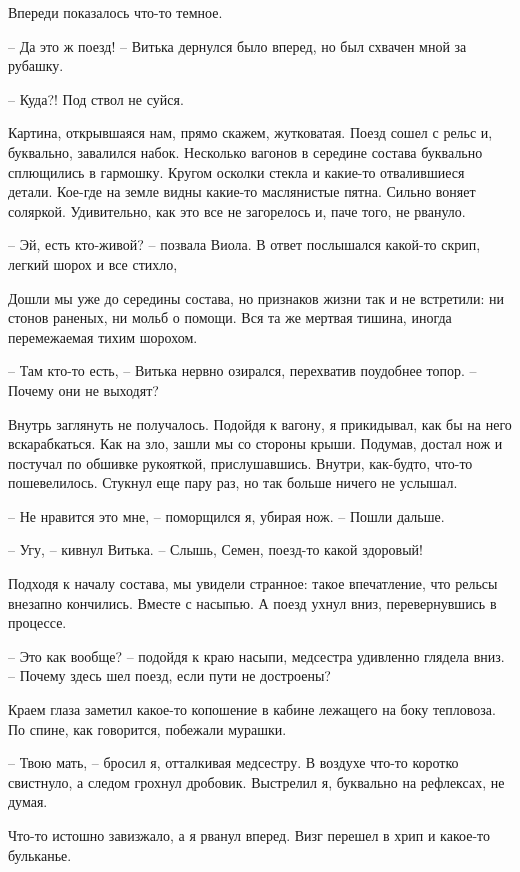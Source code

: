 \documentclass[a4paper]{book}
\begin{document}
Впереди показалось что-то темное.  

-- Да это ж поезд! -- Витька дернулся было вперед, но был схвачен мной за рубашку. 

-- Куда?! Под ствол не суйся.


Картина, открывшаяся нам, прямо скажем, жутковатая. Поезд сошел с рельс и, буквально, завалился набок. Несколько вагонов в середине состава буквально сплющились в гармошку. Кругом осколки стекла и какие-то отвалившиеся детали. Кое-где на земле видны какие-то маслянистые пятна. Сильно воняет соляркой. Удивительно, как это все не загорелось и, паче того, не рвануло.

-- Эй, есть кто-живой? -- позвала Виола. В ответ послышался какой-то скрип, легкий шорох и все стихло,

Дошли мы уже до середины состава, но признаков жизни так и не встретили: ни стонов раненых, ни мольб о помощи. Вся та же мертвая тишина, иногда перемежаемая тихим шорохом.

-- Там кто-то есть, -- Витька нервно озирался, перехватив поудобнее топор. -- Почему они не выходят?

Внутрь заглянуть не получалось. Подойдя к вагону, я прикидывал, как бы на него вскарабкаться. Как на зло, зашли мы со стороны крыши. Подумав, достал нож и постучал по обшивке рукояткой, прислушавшись. Внутри, как-будто, что-то пошевелилось. Стукнул еще пару раз, но так больше ничего не услышал.

-- Не нравится это мне, -- поморщился я, убирая нож. -- Пошли дальше.

-- Угу, -- кивнул Витька. -- Слышь, Семен, поезд-то какой здоровый!

Подходя к началу состава, мы увидели странное: такое впечатление, что рельсы внезапно кончились. Вместе с насыпью. А поезд ухнул вниз, перевернувшись в процессе. 

-- Это как вообще? -- подойдя к краю насыпи, медсестра удивленно глядела вниз. -- Почему здесь шел поезд, если пути не достроены? 

Краем глаза заметил какое-то копошение в кабине лежащего на боку тепловоза. По спине, как говорится, побежали мурашки. 

-- Твою мать, -- бросил я, отталкивая медсестру. В воздухе что-то коротко свистнуло, а следом грохнул дробовик. Выстрелил я, буквально на рефлексах, не думая. 

Что-то истошно завизжало, а я рванул вперед. Визг перешел в хрип и какое-то бульканье. 
\end{document}

